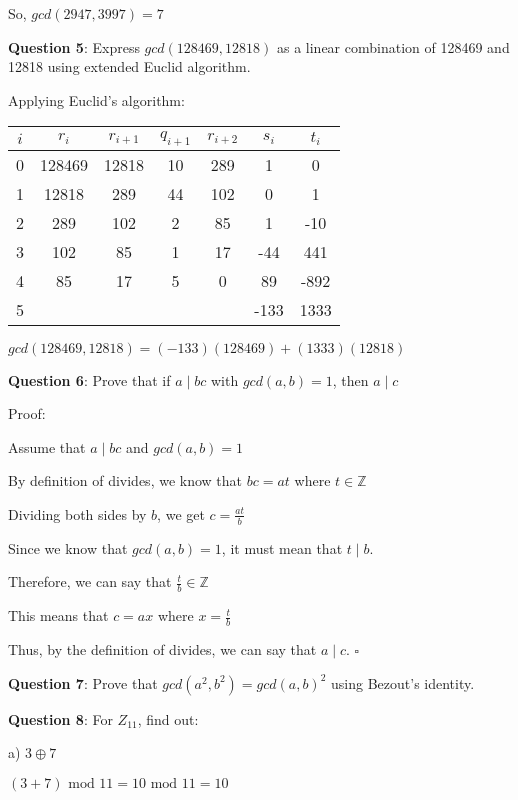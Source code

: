 \documentclass{article} %
\newcommand{\question}[2][]{\begin{flushleft}
        \textbf{Question #1}: #2

\end{flushleft}}
\begin{document}
    So, $gcd(2947, 3997) = 7$

    \question[5]{Express $gcd(128469, 12818)$ as a linear combination of 128469 and 12818 using 
    extended Euclid algorithm.}

    Applying Euclid's algorithm:
    \begin{tabular}{|c|c|c|c|c|c|c|}
        \hline
        $i$ & $r_i$ & $r_{i + 1}$ & $q_{i + 1}$ & $r_{i + 2}$ & $s_i$ & $t_i$\\\hline
        0 & 128469 & 12818 & 10 & 289 & 1    & 0    \\
        1 & 12818  & 289   & 44 & 102 & 0    & 1    \\
        2 & 289    & 102   & 2  &  85 & 1    & -10  \\
        3 & 102    & 85    & 1  &  17 & -44  & 441  \\
        4 & 85     & 17    & 5  &   0 & 89   & -892 \\
        5 &        &       &    &     & -133 & 1333 \\\hline 
    \end{tabular}
    \vspace*{0.1cm}

    $gcd(128469, 12818) = (-133)(128469) + (1333)(12818)$

    \question[6]{Prove that if $a \mid bc$ with $gcd(a, b) = 1$, then $a \mid c$}

    Proof:

    Assume that $a \mid bc$ and $gcd(a, b) = 1$

    By definition of divides, we know that $bc = at$ where $t \in \mathbb{Z}$

    Dividing both sides by $b$, we get $c = \frac{at}{b}$

    Since we know that $gcd(a, b) = 1$, it must mean that $t \mid b$.

    Therefore, we can say that $\frac{t}{b} \in \mathbb{Z}$

    This means that $c = ax$ where $x = \frac{t}{b}$ 

    Thus, by the definition of divides, we can say that $a \mid c$. $\square$

    \question[7]{Prove that $gcd(a^2,b^2)=gcd(a,b)^2$ using Bezout's identity.}

    \question[8]{For $Z_{11}$, find out:}
    
    a) $3 \oplus 7$

    \tabto{0.9cm}$(3 + 7)\text{ mod } 11 = 10 \text{ mod } 11 = 10$
\end{document}
